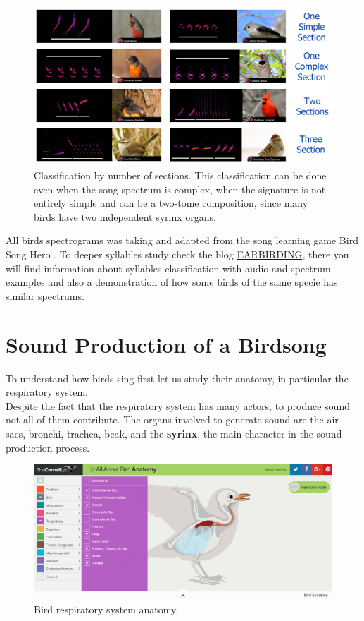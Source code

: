 \begin{figure}[H]
    \centering
    \includegraphics[scale=1.2]{Images/song_sections.png}
    \caption{Classification by number of sections. This classification can be done even when the song spectrum is complex, when the signature is not entirely simple and can be a two-tome composition, since many birds have two independent syrinx organs.}
    \label{fig:quality}
\end{figure}

All birds spectrograms was taking and adapted from the song learning game Bird Song Hero \cite{hero}. To deeper syllables study check the blog \href{http://earbirding.com/blog/archives/category/spectrograms}{EARBIRDING}, there you will find information about syllables classification with audio and spectrum examples and also a demonstration of how some birds of the same specie has similar spectrums.

\section{Sound Production of a Birdsong}

To understand how birds sing first let us study their anatomy, in particular the respiratory system.\\


Despite the fact that the respiratory system has many actors, to produce sound not all of them contribute. The organs involved to generate sound are the air sacs, bronchi, trachea, beak, and the \textbf{syrinx}, the main character in the sound production process.

\begin{figure}[H]
    \centering
    \includegraphics[width=0.85\linewidth]{Images/bird_sound_organs.png}
    \caption{Bird respiratory system anatomy. \cite{birdanatomy} }
    \label{fig:bird_sound_organs}
\end{figure}


